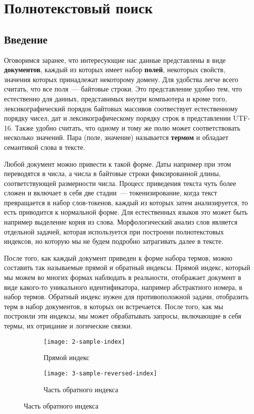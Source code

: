 \section{Полнотекстовый поиск}

\subsection{Введение}

Оговоримся заранее, что интересующие нас данные представлены в виде \textbf{документов}, каждый из которых имеет набор \textbf{полей}, некоторых свойств, значения которых принадлежат некоторому домену. Для удобства легче всего считать, что все поля~--- байтовые строки. Это представление удобно тем, что естественно для данных, представимых внутри компьютера и кроме того, лексикографический порядок байтовых массивов соотвествует естественному порядку чисел, дат и лексикографическому порядку строк в представлении UTF-16. Также удобно считать, что одному и тому же полю может соответствовать несколько значений. Пара (поле, значение) называется \textbf{термом} и обладает семантикой слова в тексте.

Любой документ можно привести к такой форме. Даты например при этом переводятся в числа, а числа в байтовые строки фиксированной длины, соответствующей размерности числа. Процесс приведения текста чуть более сложен и включает в себя две стадии~--- токенизирование, когда текст превращается в набор слов-токенов, каждый из которых затем анализируется, то есть приводится к нормальной форме. Для естественных языков это может быть например выделение корня из слова. Морфологический анализ слов является отдельной задачей, которая используется при построени полнотекстовых индексов, но которую мы не будем подробно затрагивать далее в тексте.

После того, как каждый документ приведен к форме набора термов, можно составить так называемые прямой и обратный индексы. Прямой индекс, который мы можем во многих формах наблюдать в реальности, отображает документ в виде какого-то уникального идентификатора, например абстрактного номера, в набор термов. Обратный индекс нужен для противоположной задачи, отобразить терм в набор документов, в которых он встречается. После того, как мы построили эти индексы, мы может обрабатывать запросы, включающие в себя термы, их отрицание и логические связки.

\begin{figure}[h]
	\centering
	\caption{Пример прямого и обратного индексов}
	
	\begin{subfigure}[b]{0.7\linewidth}
		\texttt{[image: 2-sample-index]}
		\caption{Прямой индекс}
	\end{subfigure}
	
	\begin{subfigure}[b]{0.7\linewidth}
		\texttt{[image: 3-sample-reversed-index]}
		\caption{Часть обратного индекса}
	\end{subfigure}
\end{figure}

